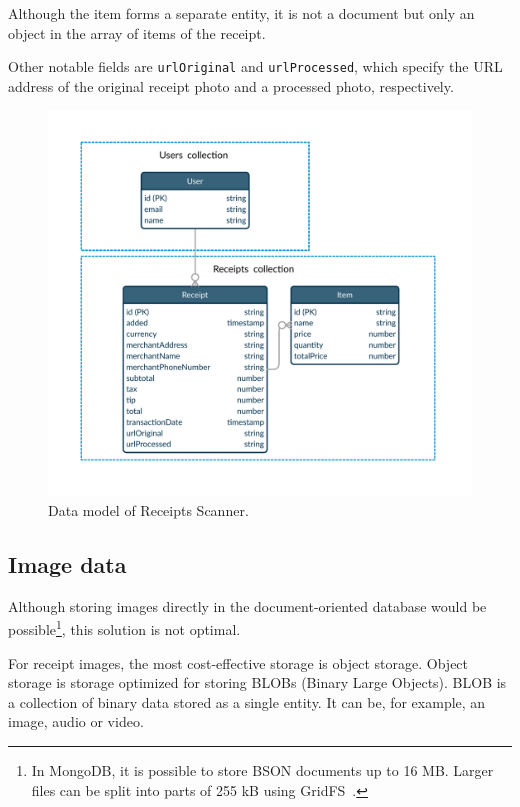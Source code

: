 \documentclass[
  digital, %
  table,   %
  oneside, %
  lof,     %
  lot,     %
]{fithesis3}
\newcommand{\definition}[1]{{#1}}
\begin{document}
Although the item forms a separate entity, it is not a document but only an object in the array of items of the receipt.

Other notable fields are \texttt{urlOriginal} and \texttt{urlProcessed}, which specify the URL address of the original receipt photo and a processed photo, respectively. 

    \begin{figure}
        \begin{center}
            \includegraphics[width=\textwidth]{figures/other/data_model_firestore}
        \end{center}
        \caption{Data model of Receipts Scanner.}
        \label{fig:data_model_firestore}
    \end{figure}

\subsection{Image data}
Although storing images directly in the document-oriented database would be possible\footnote{In MongoDB, it is possible to store BSON documents up to 16 MB. Larger files can be split into parts of 255 kB using GridFS~\cite{GridFS}.}, this solution is not optimal.

For receipt images, the most cost-effective storage is object storage. \definition{Object storage} is storage optimized for storing BLOBs (Binary Large Objects). BLOB is a collection of binary data stored as a single entity. It can be, for example, an image, audio or video. 
\end{document}
